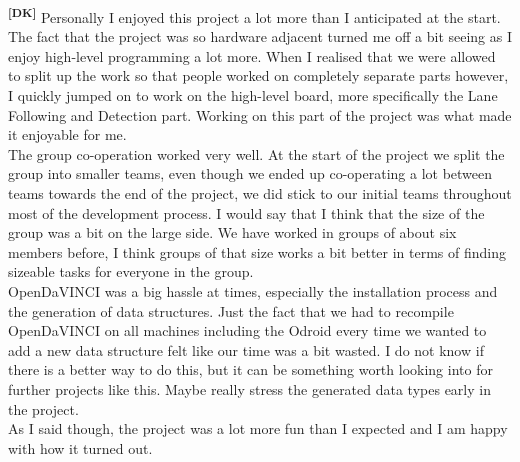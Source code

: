 \noindent
\textsuperscript{\textbf{[DK]}}
Personally I enjoyed this project a lot more than I anticipated at the start.
The fact that the project was so hardware adjacent turned me off a bit seeing as
I enjoy high-level programming a lot more. When I realised that we were allowed
to split up the work so that people worked on completely separate parts however,
I quickly jumped on to work on the high-level board, more specifically the Lane
Following and Detection part. Working on this part of the project was what made
it enjoyable for me.\\
The group co-operation worked very well. At the start of the project we split
the group into smaller teams, even though we ended up co-operating a lot between
teams towards the end of the project, we did stick to our initial teams
throughout most of the development process. I would say that I think that the
size of the group was a bit on the large side. We have worked in groups of about
six members before, I think groups of that size works a bit better in terms of
finding sizeable tasks for everyone in the group.\\
OpenDaVINCI was a big hassle at times, especially the installation process and
the generation of data structures. Just the fact that we had to recompile
OpenDaVINCI on all machines including the Odroid every time we wanted to add a
new data structure felt like our time was a bit wasted. I do not know if there
is a better way to do this, but it can be something worth looking into for
further projects like this. Maybe really stress the generated data types early
in the project.\\
As I said though, the project was a lot more fun than I expected and I am happy
with how it turned out.
